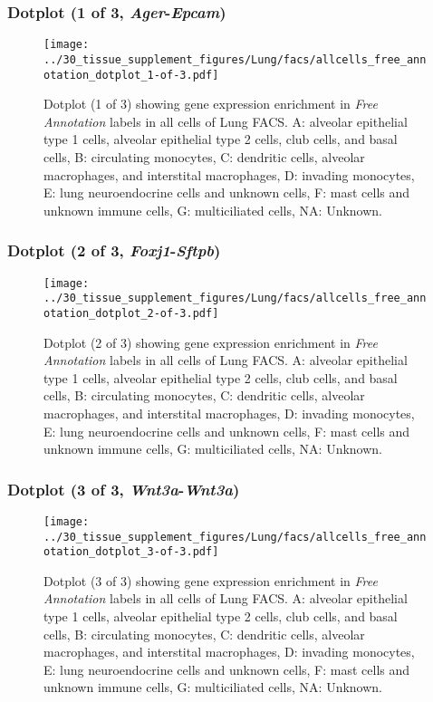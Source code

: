 \clearpage

\subsubsection{Dotplot (1 of 3, \emph{Ager}-\emph{Epcam})}
\begin{figure}[h]
\centering
\texttt{[image: ../30\_tissue\_supplement\_figures/Lung/facs/allcells\_free\_annotation\_dotplot\_1-of-3.pdf]}

\caption{ Dotplot (1 of 3)  showing gene expression enrichment in \emph{Free Annotation} labels in all cells of Lung FACS. A: alveolar epithelial type 1 cells, alveolar epithelial type 2 cells, club cells, and basal cells, B: circulating monocytes, C: dendritic cells, alveolar macrophages, and interstital macrophages, D: invading monocytes, E: lung neuroendocrine cells and unknown cells, F: mast cells and unknown immune cells, G: multiciliated cells, NA: Unknown.}
\end{figure}


\clearpage

\subsubsection{Dotplot (2 of 3, \emph{Foxj1}-\emph{Sftpb})}
\begin{figure}[h]
\centering
\texttt{[image: ../30\_tissue\_supplement\_figures/Lung/facs/allcells\_free\_annotation\_dotplot\_2-of-3.pdf]}

\caption{ Dotplot (2 of 3)  showing gene expression enrichment in \emph{Free Annotation} labels in all cells of Lung FACS. A: alveolar epithelial type 1 cells, alveolar epithelial type 2 cells, club cells, and basal cells, B: circulating monocytes, C: dendritic cells, alveolar macrophages, and interstital macrophages, D: invading monocytes, E: lung neuroendocrine cells and unknown cells, F: mast cells and unknown immune cells, G: multiciliated cells, NA: Unknown.}
\end{figure}


\clearpage

\subsubsection{Dotplot (3 of 3, \emph{Wnt3a}-\emph{Wnt3a})}
\begin{figure}[h]
\centering
\texttt{[image: ../30\_tissue\_supplement\_figures/Lung/facs/allcells\_free\_annotation\_dotplot\_3-of-3.pdf]}

\caption{ Dotplot (3 of 3)  showing gene expression enrichment in \emph{Free Annotation} labels in all cells of Lung FACS. A: alveolar epithelial type 1 cells, alveolar epithelial type 2 cells, club cells, and basal cells, B: circulating monocytes, C: dendritic cells, alveolar macrophages, and interstital macrophages, D: invading monocytes, E: lung neuroendocrine cells and unknown cells, F: mast cells and unknown immune cells, G: multiciliated cells, NA: Unknown.}
\end{figure}

